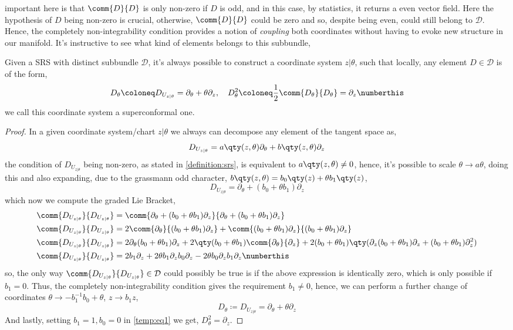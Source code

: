 important here is that $\comm{D}{D}$ is only non-zero if $D$ is odd, and in this case, by statistics, it returns 
a even vector field. Here the hypothesis of $D$ being non-zero is crucial, otherwise, $\comm{D}{D}$ could be 
zero and so, despite being even, could still belong to $\mathcal D$. Hence, the completely non-integrability 
condition provides a notion of \textit{coupling} both coordinates without having to evoke new structure in 
our manifold. It's instructive to see what kind of elements belongs to this subbundle,
\begin{lemma}\label{lemma:formd}
    Given a SRS with distinct subbundle $\mathcal D$, it's always possible to construct a 
    coordinate system $z|\theta$, such that locally, any element $D\in\mathcal D$ is of the 
    form, \[D_\theta\coloneq D_{U_{z|\theta}}=\partial_\theta+\theta\partial_z,\ \ \ D_\theta^2\coloneq\frac12\comm{D_\theta}{D_\theta}=\partial_z\numberthis\label{covariantderivative}\] we call 
    this coordinate system a superconformal one.
\end{lemma}
\begin{proof}
    In a given coordinate system/chart $z|\theta$ we always can decompose any element of the tangent space as,
    $$D_{U_{z|\theta}}=a\qty(z,\theta)\partial_\theta+b\qty(z,\theta)\partial_z$$ the condition of $D_{U_{z|\theta}}$ being 
    non-zero, as stated in \cref{definition:srs}, is equivalent to $a\qty(z,\theta)\neq 0$, hence, it's possible to scale 
    $\theta\rightarrow a\theta$, doing this and also expanding, due to the grassmann odd character, 
    $b\qty(z,\theta)=b_0\qty(z)+\theta b_1\qty(z)$, 
    $$D_{U_{z|\theta}}=\partial_\theta+(b_0+\theta b_1)\partial_z$$ which now we compute the graded Lie Bracket,
    \begin{align*}
        \comm{D_{U_{z|\theta}}}{D_{U_{z|\theta}}}&=\comm{\partial_\theta+(b_0+\theta b_1)\partial_z}{\partial_\theta+(b_0+\theta b_1)\partial_z}\\
        \comm{D_{U_{z|\theta}}}{D_{U_{z|\theta}}}&=2\comm{\partial_\theta}{(b_0+\theta b_1)\partial_z}+\comm{(b_0+\theta b_1)\partial_z}{(b_0+\theta b_1)\partial_z}\\
        \comm{D_{U_{z|\theta}}}{D_{U_{z|\theta}}}&=2\partial_\theta(b_0+\theta b_1)\partial_z+2\qty(b_0+\theta b_1)\comm{\partial_\theta}{\partial_z}+2(b_0+\theta b_1)\qty(\partial_z(b_0+\theta b_1)\partial_z+(b_0+\theta b_1)\partial^2_z)\\
        \comm{D_{U_{z|\theta}}}{D_{U_{z|\theta}}}&=2b_1\partial_z+2\theta b_1\partial_z b_0\partial_z-2\theta b_0\partial_z b_1\partial_z\numberthis\label{temp:eq1}
    \end{align*}
    so, the only way $\comm{D_{U_{z|\theta}}}{D_{U_{z|\theta}}}\in\mathcal D$ could possibly be true is if the above expression is identically zero, which is 
    only possible if $b_1=0$. Thus, the completely non-integrability condition gives the requirement $b_1\neq 0$, hence, we can perform a 
    further change of coordinates $\theta\rightarrow -b_1^{-1}b_0+\theta$, $z\rightarrow b_1 z$,
    $$D_{\theta}\coloneq D_{U_{z|\theta}}=\partial_\theta+\theta \partial_z$$ And lastly, 
    setting $b_1=1, b_0=0$ in \cref{temp:eq1} we get, $D^2_\theta = \partial_z$.
\end{proof}
